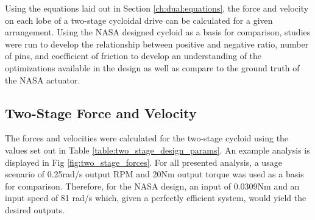 Using the equations laid out in Section \ref{ch:dual:equations}, the force and velocity on each lobe of a two-stage cycloidal drive can be calculated for a given arrangement. Using the NASA designed cycloid as a basis for comparison, studies were run to develop the relationship between positive and negative ratio, number of pins, and coefficient of friction to develop an understanding of the optimizations available in the design as well as compare to the ground truth of the NASA actuator. 

\subsection{Two-Stage Force and Velocity}\label{ch:dual:test_results:force_vel}

The forces and velocities were calculated for the two-stage cycloid using the values set out in Table \ref{table:two_stage_design_params}. An example analysis is displayed in Fig \ref{fig:two_stage_forces}. For all presented analysis, a usage scenario of 0.25rad/s output RPM and 20Nm output torque was used as a basis for comparison. Therefore, for the NASA design, an input of 0.0309Nm and an input speed of 81 rad/s which, given a perfectly efficient system, would yield the desired outputs. 

